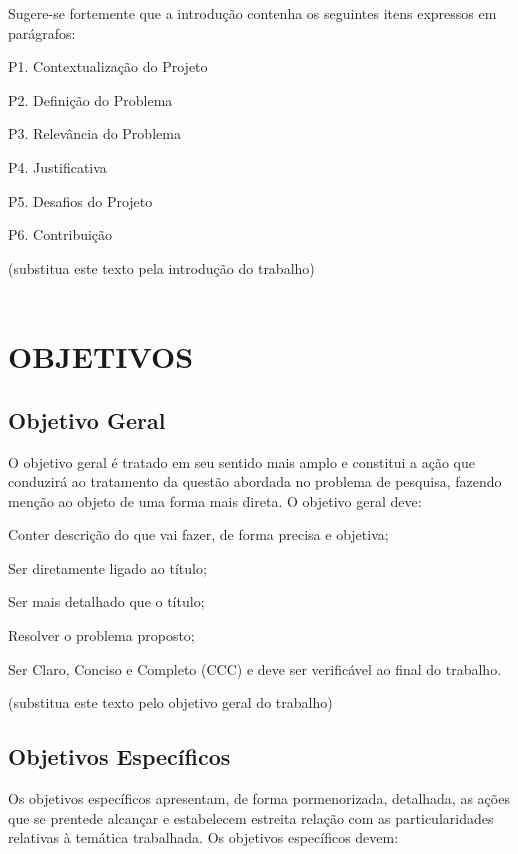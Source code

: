 Sugere-se fortemente que a  introdução contenha os seguintes itens expressos em parágrafos:


P1. Contextualização do Projeto

P2. Definição do Problema

P3. Relevância do Problema

P4. Justificativa

P5. Desafios do Projeto

P6. Contribuição

(substitua este texto pela introdução do trabalho) \\ \\

{\let\clearpage\relax \chapter{OBJETIVOS}}
\label{chap:objetivos}

\section{Objetivo Geral}
\label{sec:objgeral}
O objetivo geral é tratado em seu sentido mais amplo e constitui a ação que conduzirá ao tratamento da questão abordada no problema de pesquisa, fazendo menção ao objeto de uma forma mais direta. O objetivo geral deve:

Conter descrição do que vai fazer, de forma precisa e objetiva;

Ser diretamente ligado ao título;

Ser mais detalhado que o título;

Resolver o problema proposto;

Ser Claro, Conciso e Completo (CCC) e deve ser verificável ao final do trabalho.

(substitua este texto pelo objetivo geral do trabalho)

\section{Objetivos Específicos}
\label{sec:objespc}
Os objetivos específicos apresentam, de forma pormenorizada, detalhada, as ações que se prentede alcançar e estabelecem estreita relação com as particularidades relativas à temática trabalhada. Os objetivos específicos devem:

